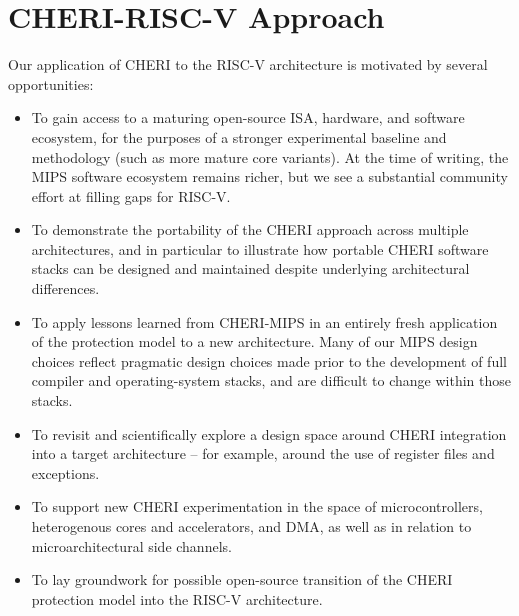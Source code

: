 
\section{CHERI-RISC-V Approach}

Our application of CHERI to the RISC-V architecture is motivated by several
opportunities:

\begin{itemize}
\item To gain access to a maturing open-source ISA, hardware, and software
  ecosystem, for the purposes of a stronger experimental baseline and
  methodology (such as more mature core variants).
  At the time of writing, the MIPS software ecosystem remains richer, but we
  see a substantial community effort at filling gaps for RISC-V.

\item To demonstrate the portability of the CHERI approach across multiple
  architectures, and in particular to illustrate how portable CHERI software
  stacks can be designed and maintained despite underlying architectural
  differences.

\item To apply lessons learned from CHERI-MIPS in an entirely fresh
  application of the protection model to a new architecture.
  Many of our MIPS design choices reflect pragmatic design choices made prior
  to the development of full compiler and operating-system stacks, and are
  difficult to change within those stacks.

\item To revisit and scientifically explore a design space around CHERI
  integration into a target architecture -- for example, around the use of
  register files and exceptions.

\item To support new CHERI experimentation in the space of microcontrollers,
  heterogenous cores and accelerators, and DMA, as well as in relation to
  microarchitectural side channels.

\item To lay groundwork for possible open-source transition of the CHERI
  protection model into the RISC-V architecture.
\end{itemize}

